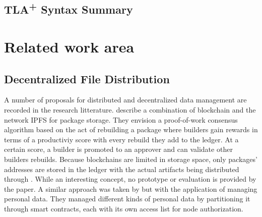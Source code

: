 \documentclass[english, biblatex, digitaloutput]{kththesis}
\begin{document}
\subsection{TLA\textsuperscript+ Syntax Summary}





\section{Related work area}

\subsection{Decentralized File Distribution}

A number of proposals for distributed and decentralized data management are recorded in the research litterature. \textcite{ince_blockchain_2020} describe a combination of blockchain and the  network \gls{IPFS} for package storage. They envision a proof-of-work consensus algorithm based on the act of rebuilding a package where builders gain rewards in terms of a productiviy score with every rebuild they add to the ledger. At a certain score, a builder is promoted to an approver and can validate other builders rebuilds. Because blockchains are limited in storage space, only packages' addresses are stored in the ledger with the actual artifacts being distributed through . While an interesting concept, no prototype or evaluation is provided by the paper. A similar approach was taken by \textcite{zichichi_efficiency_2020} but with the application of managing personal data. They managed different kinds of personal data by partitioning it through smart contracts, each with its own access list for node authorization.
\end{document}
